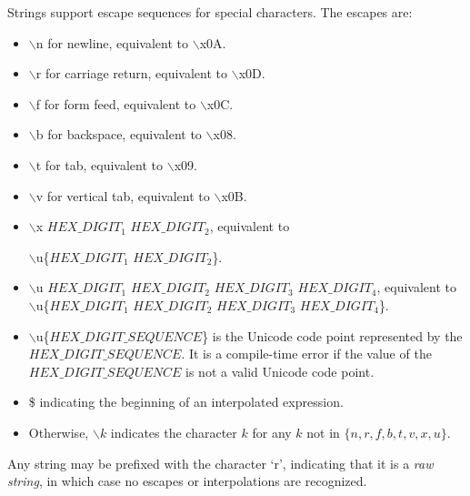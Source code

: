 \documentclass{article}
\begin{document}


\LMHash{}
Strings support escape sequences for special characters.
The escapes are:
\begin{itemize}
\item $\backslash$n for newline, equivalent to $\backslash$x0A.
\item $\backslash$r for carriage return, equivalent to $\backslash$x0D.
\item $\backslash$f for form feed, equivalent to $\backslash$x0C.
\item $\backslash$b for backspace, equivalent to $\backslash$x08.
\item $\backslash$t for tab, equivalent to $\backslash$x09.
\item $\backslash$v for vertical tab, equivalent to $\backslash$x0B.
\item $\backslash$x $HEX\_DIGIT_1$ $HEX\_DIGIT_2$, equivalent to

$\backslash$u\{$HEX\_DIGIT_1$ $HEX\_DIGIT_2$\}.
\item $\backslash$u $HEX\_DIGIT_1$ $HEX\_DIGIT_2$ $HEX\_DIGIT_3$ $HEX\_DIGIT_4$, equivalent to $\backslash$u\{$HEX\_DIGIT_1$ $HEX\_DIGIT_2$ $HEX\_DIGIT_3$ $HEX\_DIGIT_4$\}.
\item $\backslash$u\{$HEX\_DIGIT\_SEQUENCE$\} is the Unicode code point represented by the $HEX\_DIGIT\_SEQUENCE$.
It is a compile-time error if the value of the $HEX\_DIGIT\_SEQUENCE$ is not a valid Unicode code point.
\item \$ indicating the beginning of an interpolated expression.
\item Otherwise, $\backslash k$ indicates the character $k$ for any $k$ not in $\{n, r, f, b, t, v, x, u\}$.
\end{itemize}

\LMHash{}
Any string may be prefixed with the character `r', indicating that it is a {\em raw string}, in which case no escapes or interpolations are recognized.
\end{document}
